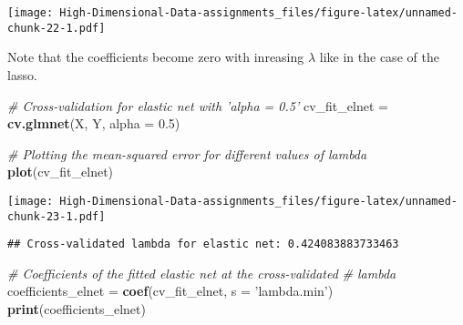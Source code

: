 \documentclass[
]{book}
\newenvironment{Shaded}{\begin{snugshade}}{\end{snugshade}}
\newcommand{\CommentTok}[1]{\textcolor[rgb]{0.56,0.35,0.01}{\textit{#1}}}
\newcommand{\DataTypeTok}[1]{\textcolor[rgb]{0.13,0.29,0.53}{#1}}
\newcommand{\FloatTok}[1]{\textcolor[rgb]{0.00,0.00,0.81}{#1}}
\newcommand{\KeywordTok}[1]{\textcolor[rgb]{0.13,0.29,0.53}{\textbf{#1}}}
\newcommand{\NormalTok}[1]{#1}
\newcommand{\OperatorTok}[1]{\textcolor[rgb]{0.81,0.36,0.00}{\textbf{#1}}}
\newcommand{\StringTok}[1]{\textcolor[rgb]{0.31,0.60,0.02}{#1}}
\begin{document}
\texttt{[image: High-Dimensional-Data-assignments\_files/figure-latex/unnamed-chunk-22-1.pdf]}

Note that the coefficients become zero with inreasing \(\lambda\) like in the case of the lasso.

\begin{Shaded}
\begin{Highlighting}[]
\CommentTok{# Cross-validation for elastic net with 'alpha = 0.5'}
\NormalTok{cv_fit_elnet =}\StringTok{ }\KeywordTok{cv.glmnet}\NormalTok{(X, Y, }\DataTypeTok{alpha =} \FloatTok{0.5}\NormalTok{)}

\CommentTok{# Plotting the mean-squared error for different values of lambda}
\KeywordTok{plot}\NormalTok{(cv_fit_elnet)}
\end{Highlighting}
\end{Shaded}

\texttt{[image: High-Dimensional-Data-assignments\_files/figure-latex/unnamed-chunk-23-1.pdf]}

\begin{Shaded}
\end{Shaded}

\begin{verbatim}
## Cross-validated lambda for elastic net: 0.424083883733463
\end{verbatim}

\begin{Shaded}
\begin{Highlighting}[]
\CommentTok{# Coefficients of the fitted elastic net at the cross-validated}
\CommentTok{# lambda}
\NormalTok{coefficients_elnet =}\StringTok{ }\KeywordTok{coef}\NormalTok{(cv_fit_elnet, }\DataTypeTok{s =} \StringTok{'lambda.min'}\NormalTok{)}
\KeywordTok{print}\NormalTok{(coefficients_elnet)}
\end{Highlighting}
\end{Shaded}
\end{document}
